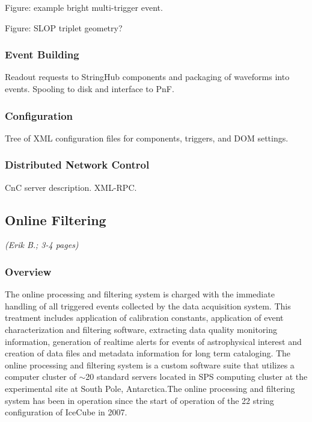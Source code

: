 Figure: example bright multi-trigger event.  

Figure: SLOP triplet geometry?

\subsubsection{Event Building}

Readout requests to StringHub components and packaging of waveforms into
events.  Spooling to disk and interface to PnF.


\subsubsection{Configuration}

Tree of XML configuration files for components, triggers, and DOM settings.  

\subsubsection{Distributed Network Control}

CnC server description.  XML-RPC.  %

\subsection{Online Filtering}
\textsl{(Erik B.; 3-4 pages)}
\subsubsection{Overview}

The online processing and filtering system is charged with the immediate handling of all triggered events collected by the data
acquisition system.  This treatment includes application of calibration constants, application of event characterization and filtering software,  
extracting data quality monitoring information, generation of realtime alerts for events of astrophysical interest
and creation of data files and metadata information for long term cataloging.  The online processing and filtering system
is a custom software suite that utilizes a computer cluster of $\sim$20 standard servers located in SPS computing cluster
at the experimental site at South Pole, Antarctica.The online processing and filtering system has been in operation since the
start of operation of the 22 string configuration of IceCube in 2007.

